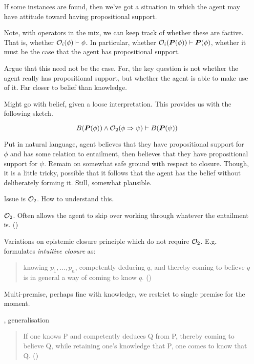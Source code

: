 {\begin{note}
    If some instances are found, then we've got a situation in which the agent may have attitude toward having propositional support.

    Note, with operators in the mix, we can keep track of whether these are factive.
    That is, whether \(\mathcal{O}_{i}(\phi) \vdash \phi\).
    In particular, whether \(\mathcal{O}_{i}(\bm{P}(\phi)) \vdash \bm{P}(\phi)\), whether it must be the case that the agent has propositional support.

    Argue that this need not be the case.
    For, the key question is not whether the agent really has propositional support, but whether the agent is able to make use of it.
    Far closer to belief than knowledge.

    Might go with belief, given a loose interpretation.
    This provides us with the following sketch.

    \[B(\bm{P}(\phi)) \land \mathcal{O}_{2}(\phi \Rightarrow{} \psi) \vdash B(\bm{P}(\psi))\]

    Put in natural language, agent believes that they have propositional support for \(\phi\) and has some relation to entailment, then believes that they have propositional support for \(\psi\).
    Remain on somewhat safe ground with respect to closure.
    Though, it is a little tricky, possible that it follows that the agent has the belief without deliberately forming it.
    Still, somewhat plausible.

    Issue is \(\mathcal{O}_{2}\).
    How to understand this.

    \(\mathcal{O}_{2}\).
    Often allows the agent to skip over working through whatever the entailment is. (\cite[28]{Hawthorne:2005tb})

    Variations on epistemic closure principle which do not require \(\mathcal{O}_{2}\).
    E.g.\ \citeauthor{Williamson:2000wx} formulates \emph{intuitive closure} as:
    \begin{quote}
      knowing \(p_{1},\dots,p_{n}\), competently deducing \(q\), and thereby coming to believe \(q\) is in general a way of coming to know \(q\).\nolinebreak
      \mbox{}\hfill\mbox{(\citeyear[117]{Williamson:2000wx})}
    \end{quote}
    Multi-premise, perhaps fine with knowledge, we restrict to single premise for the moment.

    \citeauthor{Hawthorne:2005tb}, generalisation
    \begin{quote}
      If one knows P and competently deduces Q from P, thereby coming to believe Q, while retaining one’s knowledge that P, one comes to know that Q.\nolinebreak
      \mbox{}\hfill\mbox{(\citeyear[29]{Hawthorne:2005tb})}
    \end{quote}


\end{note}}

